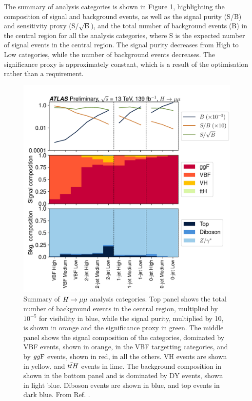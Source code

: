 The summary of analysis categories is shown in Figure \ref{fig:hmumu:cat-summary},
highlighting the composition of signal and background events, as well
as the signal purity (S/B) and sensitivity proxy (S/$\sqrt{\text{B}}$),
and the total number of background events (B) in the central region for
all the analysis categories, where S is the expected number of signal events
in the central region. The signal purity decreases from High to
Low categories, while the number of background events decreases. The
significance proxy is approximately constant, which is a result of the 
optimisation rather than a requirement.
\begin{figure}[h!]
  \centering
  \includegraphics[width=1.0\textwidth]{figures/hmumu/cat-summary}
  \caption[Summary of $\hmumu$ analysis categories]{Summary of $\hmumu$
  analysis categories. Top panel shows the total number of background events
  in the central region, multiplied by $10^{-5}$ for visibility in blue,
  while the signal purity, multiplied by 10, is shown in orange and the
  significance proxy in green. The middle panel shows the signal
  composition of the categories, dominated by VBF events, shown in orange,
  in the VBF targetting categories, and by $gg\text{F}$ events, shown in red,
  in all the others. VH events are shown in yellow, and $t\bar{t} H$ events
  in lime. The background composition in shown in the bottom 
  panel and is dominated by DY events, shown in light blue. Diboson events
  are shown in blue, and top events in dark blue. From Ref. \cite{ATLAS-CONF-2019-028}.
  }
  \label{fig:hmumu:cat-summary}
\end{figure}

